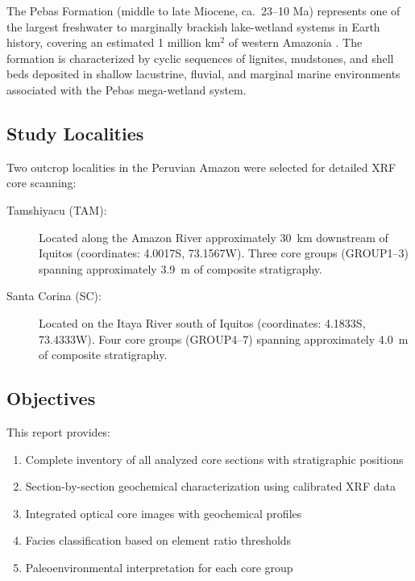 \documentclass[11pt,a4paper]{article}
\begin{document}
The Pebas Formation (middle to late Miocene, ca.\ 23--10 Ma) represents one of the largest freshwater to marginally brackish lake-wetland systems in Earth history, covering an estimated 1 million km$^2$ of western Amazonia \citep{Wesselingh2002, Hoorn2010}. The formation is characterized by cyclic sequences of lignites, mudstones, and shell beds deposited in shallow lacustrine, fluvial, and marginal marine environments associated with the Pebas mega-wetland system.

\subsection{Study Localities}

Two outcrop localities in the Peruvian Amazon were selected for detailed XRF core scanning:

\begin{description}
    \item[Tamshiyacu (TAM):] Located along the Amazon River approximately 30~km downstream of Iquitos (coordinates: 4.0017\textdegree S, 73.1567\textdegree W). Three core groups (GROUP1--3) spanning approximately 3.9~m of composite stratigraphy.

    \item[Santa Corina (SC):] Located on the Itaya River south of Iquitos (coordinates: 4.1833\textdegree S, 73.4333\textdegree W). Four core groups (GROUP4--7) spanning approximately 4.0~m of composite stratigraphy.
\end{description}

\subsection{Objectives}

This report provides:
\begin{enumerate}
    \item Complete inventory of all analyzed core sections with stratigraphic positions
    \item Section-by-section geochemical characterization using calibrated XRF data
    \item Integrated optical core images with geochemical profiles
    \item Facies classification based on element ratio thresholds
    \item Paleoenvironmental interpretation for each core group
\end{enumerate}

\end{document}
